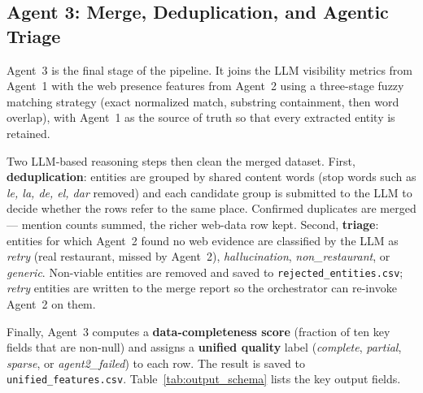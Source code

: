 \subsection{Agent 3: Merge, Deduplication, and Agentic Triage}

Agent~3 is the final stage of the pipeline. It joins the LLM visibility metrics
from Agent~1 with the web presence features from Agent~2 using a three-stage fuzzy
matching strategy (exact normalized match, substring containment, then word overlap),
with Agent~1 as the source of truth so that every extracted entity is retained.

Two LLM-based reasoning steps then clean the merged dataset. First,
\textbf{deduplication}: entities are grouped by shared content words (stop words
such as \textit{le, la, de, el, dar} removed) and each candidate group is submitted
to the LLM to decide whether the rows refer to the same place. Confirmed duplicates
are merged --- mention counts summed, the richer web-data row kept.
Second, \textbf{triage}: entities for which Agent~2 found no web evidence are
classified by the LLM as \textit{retry} (real restaurant, missed by Agent~2),
\textit{hallucination}, \textit{non\_restaurant}, or \textit{generic}.
Non-viable entities are removed and saved to \texttt{rejected\_entities.csv};
\textit{retry} entities are written to the merge report so the orchestrator can
re-invoke Agent~2 on them.

Finally, Agent~3 computes a \textbf{data-completeness score} (fraction of ten key
fields that are non-null) and assigns a \textbf{unified quality} label
(\textit{complete}, \textit{partial}, \textit{sparse}, or \textit{agent2\_failed})
to each row. The result is saved to \texttt{unified\_features.csv}.
Table~\ref{tab:output_schema} lists the key output fields.

